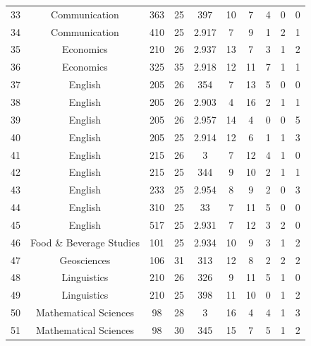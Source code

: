 \documentclass[12pt,letterpaper,oneside,openany]{book}
\begin{document}
\begin{center}
\begin{longtable}{c||ccccccccc}
		33 & Communication                   & 363   & 25                & 397 & 10 & 7  & 4 & 0 & 0 \\
		34 & Communication                   & 410   & 25                & 2.917 & 7  & 9  & 1 & 2 & 1 \\
		35 & Economics                       & 210   & 26                & 2.937 & 13 & 7  & 3 & 1 & 2 \\
		36 & Economics                       & 325   & 35                & 2.918 & 12 & 11 & 7 & 1 & 1 \\
		37 & English                         & 205   & 26                & 354 & 7  & 13 & 5 & 0 & 0 \\
		38 & English                         & 205   & 26                & 2.903 & 4  & 16 & 2 & 1 & 1 \\
		39 & English                         & 205   & 26                & 2.957 & 14 & 4  & 0 & 0 & 5 \\
		40 & English                         & 205   & 25                & 2.914 & 12 & 6  & 1 & 1 & 3 \\
		41 & English                         & 215   & 26                & 3   & 7  & 12 & 4 & 1 & 0 \\
		42 & English                         & 215   & 25                & 344 & 9  & 10 & 2 & 1 & 1 \\
		43 & English                         & 233   & 25                & 2.954 & 8  & 9  & 2 & 0 & 3 \\
		44 & English                         & 310   & 25                & 33  & 7  & 11 & 5 & 0 & 0 \\
		45 & English                         & 517   & 25                & 2.931 & 7  & 12 & 3 & 2 & 0 \\
		46 & Food \& Beverage Studies        & 101   & 25                & 2.934 & 10 & 9  & 3 & 1 & 2 \\
		47 & Geosciences                     & 106   & 31                & 313 & 12 & 8  & 2 & 2 & 2 \\
		48 & Linguistics                     & 210   & 26                & 326 & 9  & 11 & 5 & 1 & 0 \\
		49 & Linguistics                     & 210   & 25                & 398 & 11 & 10 & 0 & 1 & 2 \\
		50 & Mathematical Sciences           & 98    & 28                & 3   & 16 & 4  & 4 & 1 & 3 \\
		51 & Mathematical Sciences           & 98    & 30                & 345 & 15 & 7  & 5 & 1 & 2 \\

\end{longtable}
\end{center}
\end{document}
